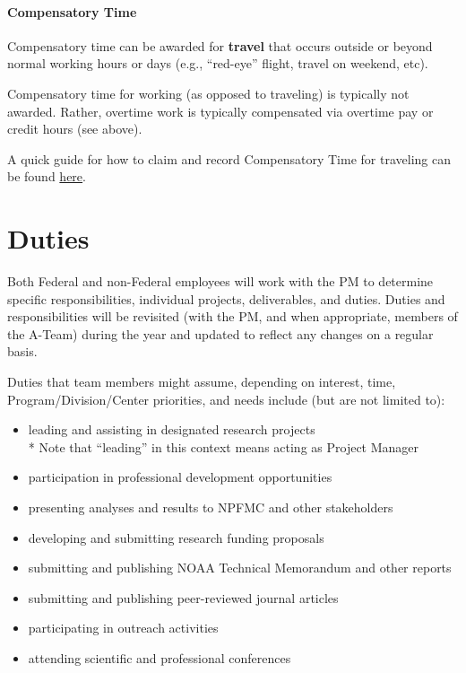\documentclass[
  letterpaper,
  DIV=11,
  numbers=noendperiod]{scrreprt}
\let\oldparagraph\paragraph
\renewcommand{\paragraph}[1]{\oldparagraph{#1}\mbox{}}
\providecommand{\tightlist}{%
  \setlength{\itemsep}{0pt}\setlength{\parskip}{0pt}}\usepackage{longtable,booktabs,array}
\begin{document}
\paragraph{Compensatory Time}\label{compensatory-time}

Compensatory time can be awarded for \textbf{travel} that occurs outside
or beyond normal working hours or days (e.g., ``red-eye'' flight, travel
on weekend, etc).

Compensatory time for working (as opposed to traveling) is typically not
awarded. Rather, overtime work is typically compensated via overtime pay
or credit hours (see above).

A quick guide for how to claim and record Compensatory Time for
traveling can be found
\href{https://docs.google.com/document/d/1BdvL0mbBE0JY5HkDjdoi5RhCc0rn3G0SfXFHeo03nzY/edit}{here}.

\section{Duties}\label{duties}

Both Federal and non-Federal employees will work with the PM to
determine specific responsibilities, individual projects, deliverables,
and duties. Duties and responsibilities will be revisited (with the PM,
and when appropriate, members of the A-Team) during the year and updated
to reflect any changes on a regular basis.

Duties that team members might assume, depending on interest, time,
Program/Division/Center priorities, and needs include (but are not
limited to):

\begin{itemize}
\tightlist
\item
  leading and assisting in designated research projects\\
  * Note that ``leading'' in this context means acting as Project
  Manager\\
\item
  participation in professional development opportunities
\item
  presenting analyses and results to NPFMC and other stakeholders\\
\item
  developing and submitting research funding proposals
\item
  submitting and publishing NOAA Technical Memorandum and other reports
\item
  submitting and publishing peer-reviewed journal articles
\item
  participating in outreach activities
\item
  attending scientific and professional conferences
\end{itemize}
\end{document}

